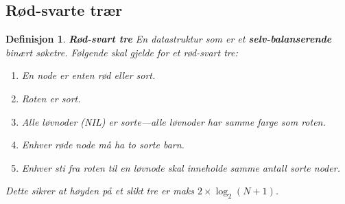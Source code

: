 \documentclass[11pt,a4paper]{article}
\theoremstyle{def}
\newtheorem{definition}[subsection]{Definisjon}
\begin{document}
\subsection{Rød-svarte trær}
\begin{definition}
\emph{\textbf{Rød-svart tre}}
En datastruktur som er et \textbf{selv-balanserende} binært søketre. Følgende skal gjelde for et rød-svart tre:
\begin{enumerate}
\item
En node er enten rød eller sort.
\item
Roten er sort.
\item
Alle løvnoder (NIL) er sorte---alle løvnoder har samme farge som roten.
\item
Enhver røde node må ha to sorte barn.
\item
Enhver sti fra roten til en løvnode skal inneholde samme antall sorte noder.
\end{enumerate}
Dette sikrer at høyden på et slikt tre er maks $2\times\log_2(N+1)$.
\end{definition}


\end{document}
